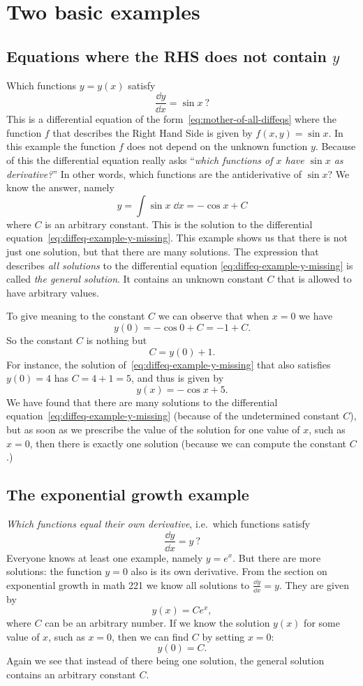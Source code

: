 \section{Two basic examples} %

\subsection{Equations where the RHS does not contain $y$} %
\label{sec:diffeq-y-missing}

Which functions $y=y(x)$ satisfy
\begin{equation}
  \label{eq:diffeq-example-y-missing}
  \frac{\dd y} {\dd x} = \sin x ~?
\end{equation}
This is a differential equation of the form~\eqref{eq:mother-of-all-diffeqs} where
the function $f$ that describes the Right Hand Side is given by $f(x,y) = \sin x$.
In this example the function $f$ does not depend on the unknown function $y$.
Because of this the differential equation really asks ``\textit{which functions of
  $x$ have $\sin x$ as derivative?}''  In other words, which functions are the
antiderivative of $\sin x$?  We know the answer, namely
\[
y = \int \sin x\;\dd x = -\cos x +C
\]
where $C$ is an arbitrary constant.
This is the solution to the differential
equation~\eqref{eq:diffeq-example-y-missing}.  This example shows us that there
is not just one solution, but that there are many solutions.  The expression
that describes \emph{all solutions} to the differential equation
\eqref{eq:diffeq-example-y-missing} is called \emph{the general solution}.  It
contains an unknown constant $C$ that is allowed to have arbitrary values.

To give meaning to the constant $C$ we can observe that when $x=0$ we have
\[
y(0) = - \cos 0 + C = -1+C.
\]
So the constant $C$ is nothing but
\[
C=y(0)+1.
\]
For instance, the solution of~\eqref{eq:diffeq-example-y-missing} that also satisfies
$y(0)=4$ has $C=4+1=5$, and thus is given by
\[
y(x) = -\cos x + 5.
\]
We have found that there are many solutions to the differential
equation~\eqref{eq:diffeq-example-y-missing} (because of the undetermined constant
$C$), but as soon as we prescribe the value of the solution for one value of $x$,
such as $x=0$, then there is exactly one solution (because we can compute the
constant $C$.)


\subsection{The exponential growth example} %
\textit{Which functions equal their own derivative}, i.e.~which functions satisfy
\[
\frac{\dd y} {\dd x} = y ~?
\]
Everyone knows at least one example, namely $y=e^x$.  But there are more solutions:
the function $y=0$ also is its own derivative.  From the section on exponential
growth in math 221 we know all solutions to $\frac{\dd y} {\dd x} = y$.  They are
given by
\[
y(x) = C e^x,
\]
where $C$ can be an arbitrary number.  If we know the solution $y(x)$ for some value
of $x$, such as $x=0$, then we can find $C$ by setting $x=0$:
\[
y(0) = C.
\]
Again we see that instead of there being one solution, the general solution contains
an arbitrary constant $C$.

